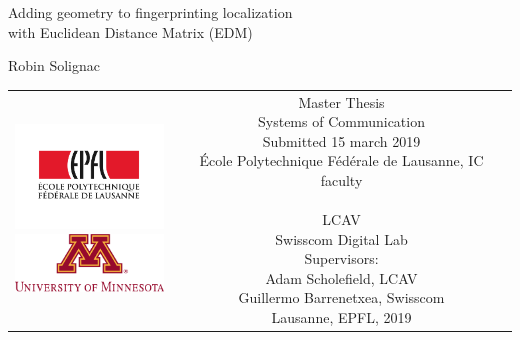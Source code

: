 
\begin{titlepage}
    \begin{center}
    \sffamily
    
    
    \null\vspace{2cm}
    {\huge Adding geometry to fingerprinting localization \\[12pt] with Euclidean Distance Matrix (EDM)} \\[24pt] 
    
    \vspace{3cm}
    
    {\LARGE Robin Solignac}
        
    \vfill
    
    \begin{tabular} {cc}
    \parbox{0.3\textwidth}{\includegraphics[width=4cm]
    {images/epfl} \\[30pt]
    \includegraphics[width=4cm]
    {images/UofM2}}
    &
    \parbox{0.7\textwidth}{
        Master Thesis \\
        Systems of Communication\\
        Submitted 15 march 2019\\
        École Polytechnique Fédérale de Lausanne, IC faculty\\
        \\
        LCAV \\
        Swisscom Digital Lab\\[6pt]
    
        Supervisors:\\[4pt]
            Adam Scholefield, LCAV\\
            Guillermo Barrenetxea, Swisscom\\[12pt]
        Lausanne, EPFL, 2019}
    \end{tabular}
    \end{center}
    \vspace{1cm}
    \end{titlepage}
    
